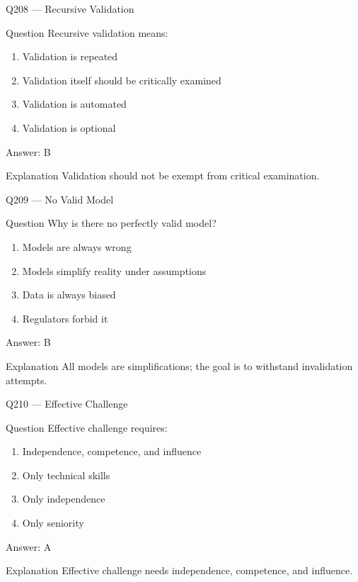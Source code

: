 \documentclass[aspectratio=169,8pt]{beamer}
\begin{document}
\begin{frame}{Q208 --- Recursive Validation}
\begin{block}{Question}
Recursive validation means:
\begin{enumerate}
\item Validation is repeated
\item Validation itself should be critically examined
\item Validation is automated
\item Validation is optional
\end{enumerate}
\end{block}
\begin{exampleblock}{Answer: B}\end{exampleblock}
\begin{block}{Explanation}
Validation should not be exempt from critical examination.
\end{block}
\end{frame}

\begin{frame}{Q209 --- No Valid Model}
\begin{block}{Question}
Why is there no perfectly valid model?
\begin{enumerate}
\item Models are always wrong
\item Models simplify reality under assumptions
\item Data is always biased
\item Regulators forbid it
\end{enumerate}
\end{block}
\begin{exampleblock}{Answer: B}\end{exampleblock}
\begin{block}{Explanation}
All models are simplifications; the goal is to withstand invalidation attempts.
\end{block}
\end{frame}

\begin{frame}{Q210 --- Effective Challenge}
\begin{block}{Question}
Effective challenge requires:
\begin{enumerate}
\item Independence, competence, and influence
\item Only technical skills
\item Only independence
\item Only seniority
\end{enumerate}
\end{block}
\begin{exampleblock}{Answer: A}\end{exampleblock}
\begin{block}{Explanation}
Effective challenge needs independence, competence, and influence.
\end{block}
\end{frame}
\end{document}
